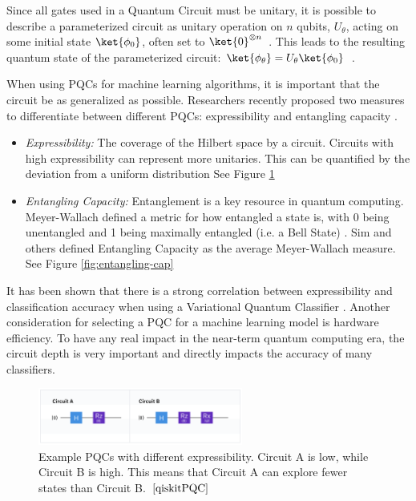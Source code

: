 \documentclass[11pt]{article}
\begin{document}
Since all gates used in a Quantum Circuit must be unitary, it is possible to describe a parameterized circuit as unitary operation 
on $n$ qubits, $U_\theta$, acting on some initial state $\ket{\phi_0}$, often set to $\ket{0}^{\otimes n}$~\cite{qiskitPQC}.
This leads to the resulting quantum state of the parameterized circuit: $\ket{\phi_\theta} = U_\theta\ket{\phi_0}$~\cite{qiskitPQC}.

When using PQCs for machine learning algorithms, it is important that the circuit be as generalized as possible. Researchers recently
proposed two measures to differentiate between different PQCs: expressibility and entangling capacity \cite{Sim_2019}.

\begin{itemize}
    \item \textit{Expressibility:} The coverage of the Hilbert space by a circuit. Circuits with high expressibility can 
    represent more unitaries. This can be quantified by the deviation from a uniform distribution \cite{Sim_2019} 
    See Figure \ref{fig:expressibility}

    \item \textit{Entangling Capacity:} Entanglement is a key resource in quantum computing. Meyer-Wallach defined a metric for how
    entangled a state is, with 0 being unentangled and 1 being maximally entangled (i.e. a Bell State) \cite{brennen2003observable}.
    Sim and others defined Entangling Capacity as the average Meyer-Wallach measure. See Figure \ref{fig:entangling-cap}
\end{itemize}

It has been shown that there is a strong correlation between expressibility and classification accuracy when using a Variational
Quantum Classifier \cite{hubregtsen2020evaluation}. Another consideration for selecting a PQC for a machine learning model is hardware
efficiency. To have any real impact in the near-term quantum computing era, the circuit depth is very important and directly impacts
the accuracy of many classifiers.
\begin{figure}[!h]
    \centering
    \includegraphics[width=0.6\textwidth]{./figures/Expressibility.png} 
    \caption{Example PQCs with different expressibility. Circuit A is low, while Circuit B is high. This means 
    that Circuit A can explore fewer states than Circuit B.~$\cite{qiskitPQC}$ }
    \label{fig:expressibility}
\end{figure}
\end{document}
